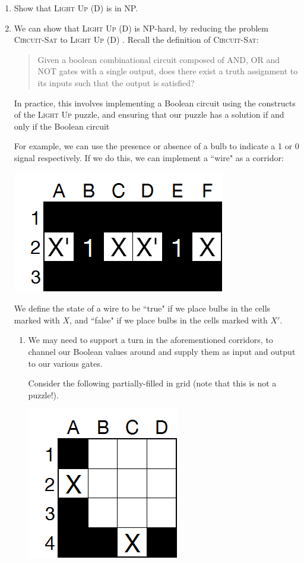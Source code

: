 \documentclass[12pt, a4paper]{article}
\begin{document}
\begin{enumerate}
\item Show that \textsc{Light Up (D)} is in NP.

\item We can show that \textsc{Light Up (D)} is NP-hard, by reducing the problem
\textsc{Circuit-Sat} to \textsc{Light Up (D)} \cite{akari2}. Recall the definition
of \textsc{Circuit-Sat}:

\begin{quote}
Given a boolean combinational circuit composed of AND, OR and NOT gates with a single
output, does there exist a truth assignment to its inputs such that the output is 
satisfied?
\end{quote}

In practice, this involves implementing a Boolean circuit using the constructs of the 
\textsc{Light Up} puzzle, and ensuring that our puzzle has a solution if and only if
the Boolean circuit

For example, we can use the presence or absence of a bulb to indicate a 1 or 0 signal
respectively. If we do this, we can implement a ``wire" as a corridor:

\begin{center}
\includegraphics[scale=0.7]{lightsout3.png}
\end{center}

We define the state of a wire to be ``true" if we place bulbs in the cells marked with
$X$, and ``false" if we place bulbs in the cells marked with $X'$.

\begin{enumerate}
\item We may need to support a turn in the aforementioned corridors, to channel
our Boolean values around and supply them as input and output to our various gates.

Consider the following partially-filled in grid (note that this is not a
puzzle!).
\begin{center}
\includegraphics[scale=0.7]{lightsout4.png}
\end{center}


\end{enumerate}
\end{enumerate}
\end{document}
